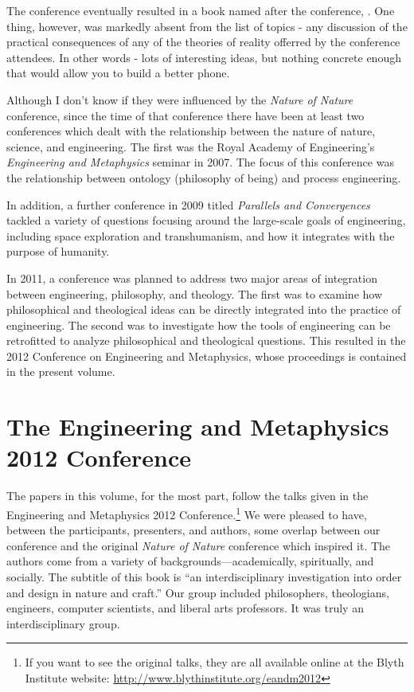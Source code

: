 The conference eventually resulted in a book named after the conference, .\citep{natnat2011}  One thing, however, was markedly absent from the list of topics - any discussion of the practical consequences of any of the theories of reality offerred by the conference attendees.  In other words - lots of interesting ideas, but nothing concrete enough that would allow you to build a better phone.

Although I don't know if they were influenced by the \textit{Nature of Nature} conference, since the time of that conference there have been at least two conferences which dealt with the relationship between the nature of nature, science, and engineering.
The first was the Royal Academy of Engineering's \textit{Engineering and Metaphysics} seminar in 2007.  The focus of this conference was the relationship between ontology (philosophy of being) and process engineering.  %

In addition, a further conference in 2009 titled \textit{Parallels and Convergences} tackled a variety of questions focusing around the large-scale goals of engineering, including space exploration and transhumanism, and how it integrates with the purpose of humanity. %

In 2011, a conference was planned to address two major areas of integration between engineering, philosophy, and theology.  The first was to examine how philosophical and theological ideas can be directly integrated into the practice of engineering.  The second was to investigate how the tools of engineering can be retrofitted to analyze philosophical and theological questions.  This resulted in the 2012 Conference on Engineering and Metaphysics, whose proceedings is contained in the present volume.

\section{The Engineering and Metaphysics 2012 Conference}

The papers in this volume, for the most part, follow the talks given in the Engineering and Metaphysics 2012 Conference.\footnote{If you want to see the original talks, they are all available online at the Blyth Institute website: \url{http://www.blythinstitute.org/eandm2012}}  We were pleased to have, between the participants, presenters, and authors, some overlap between our conference and the original \textit{Nature of Nature} conference which inspired it.  The authors come from a variety of backgrounds---academically, spiritually, and socially.  The subtitle of this book is ``an interdisciplinary investigation into order and design in nature and craft.''  Our group included philosophers, theologians, engineers, computer scientists, and liberal arts professors.  It was truly an interdisciplinary group.  

